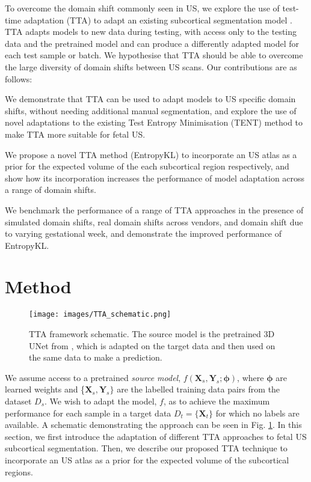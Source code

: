 \documentclass[conference]{IEEEtran}
\begin{document}
To overcome the domain shift commonly seen in US, we explore the use of test-time adaptation (TTA) to adapt an existing subcortical segmentation model \cite{Hesse2022}. TTA adapts models to new data during testing, with access only to the testing data and the pretrained model \cite{Janouskova2024,Wang2021} and can produce a differently adapted model for each test sample or batch. We hypothesise that TTA should be able to overcome the large diversity of domain shifts between US scans. Our contributions are as follows:
\begin{compactitem} 
    \item We demonstrate that TTA can be used to adapt models to US specific domain shifts, without needing additional manual segmentation, and explore the use of novel adaptations to the existing Test Entropy Minimisation (TENT) method \cite{Wang2021} to make TTA more suitable for fetal US.
    \item We propose a novel TTA method (EntropyKL) to incorporate an US atlas \cite{Namburete2023} as a prior for the expected volume of the each subcortical region respectively, and show how its incorporation increases the performance of model adaptation across a range of domain shifts.
    \item We benchmark the performance of a range of TTA approaches in the presence of simulated domain shifts, real domain shifts across vendors, and domain shift due to varying gestational week, and demonstrate the improved performance of EntropyKL. 
\end{compactitem}

\section{Method}

\begin{figure}[htbp]
    \centering
    \texttt{[image: images/TTA\_schematic.png]}
    \caption{TTA framework schematic. The source model is the pretrained 3D UNet from \cite{Hesse2022}, which is adapted on the target data and then used on the same data to make a prediction. %
    }
    \label{fig:TTA schematic}
    \vspace*{-5pt}
\end{figure}

We assume access to a pretrained \textit{source model}, $f(\bm{X}_s, \bm{Y}_s; \bm{\phi})$, where $\bm{\phi}$ are learned weights and \{$\bm{X}_s, \bm{Y}_s\}$ are the labelled training data pairs from the dataset $D_s$. We wish to adapt the model, $f$, as to achieve the maximum performance for each sample in a target data $D_t = \{\bm{X}_t\}$ for which no labels are available. A schematic demonstrating the approach can be seen in Fig. \ref{fig:TTA schematic}. 
In this section, we first introduce the adaptation of different TTA approaches to fetal US subcortical segmentation. 
Then, we describe our proposed TTA technique to incorporate an US atlas \cite{Namburete2023} as a prior for the expected volume of the subcortical regions.
\end{document}
